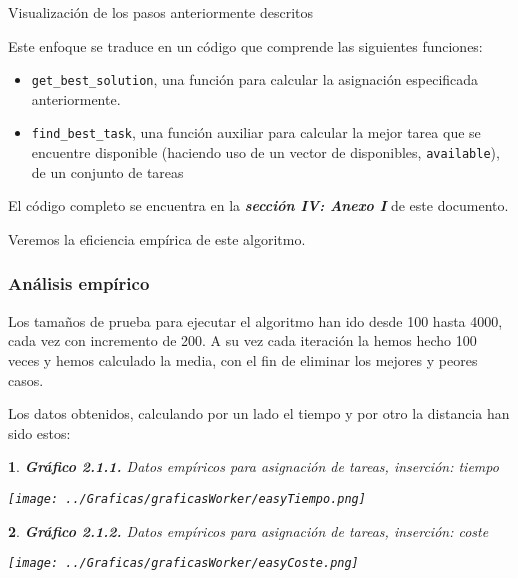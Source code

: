 \documentclass[10pt, a4paper]{article}
\theoremstyle{theorem-style}
\newtheorem*{datos}{}
\theoremstyle{theorem-style}
\theoremstyle{definition-style}
\theoremstyle{remark-style}
\theoremstyle{example-style}
\theoremstyle{definition-style}
\theoremstyle{remark-style}
\begin{document}
\begin{center}
	\footnotesize{Visualización de los pasos anteriormente descritos}
\end{center}
\vspace{0.3cm}
Este enfoque se traduce en un código que comprende las siguientes funciones:

\begin{itemize}
	\item \texttt{get\_best\_solution}, una función para calcular la asignación especificada anteriormente.
	\item \texttt{find\_best\_task}, una función auxiliar para calcular la mejor tarea que se encuentre disponible (haciendo uso de un vector de disponibles, \texttt{available}), de un conjunto de tareas
\end{itemize}

El código completo se encuentra en la \textbf{\emph{sección IV: Anexo I}} de este documento.

Veremos la eficiencia empírica de este algoritmo.

\subsubsection*{Análisis empírico}
Los tamaños de prueba para ejecutar el algoritmo han ido desde 100 hasta 4000, cada vez con incremento de 200. A su vez cada iteración la hemos hecho 100 veces y hemos calculado la media, con el fin de eliminar los mejores y peores casos.  

Los datos obtenidos, calculando por un lado el tiempo y por otro la distancia han sido estos:
\pagebreak
\begin{datos}
	{\bf\sffamily Gráfico 2.1.1.} {\sffamily Datos empíricos para asignación de tareas, inserción: tiempo}\\
	\vspace{-0.7cm}
	\begin{center}
		\texttt{[image: ../Graficas/graficasWorker/easyTiempo.png]}
	\end{center}	
\end{datos}
\begin{datos}
	{\bf\sffamily Gráfico 2.1.2.} {\sffamily Datos empíricos para asignación de tareas, inserción: coste}\\
	\vspace{-0.7cm}
	\begin{center}
	\texttt{[image: ../Graficas/graficasWorker/easyCoste.png]}
	\end{center}	
\end{datos}
\end{document}
